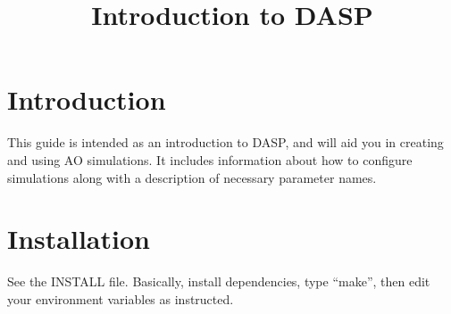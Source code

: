 \documentclass{article}
\begin{document}
%
\newcommand{\daspproject}{Durham AO Simulation Platform}
\newcommand{\dasptitle}{Introduction to DASP}
\newcommand{\daspdocno}{DASP-INT-UoD-001}
\newcommand{\daspdoctype}{Internal}
\newcommand{\daspissue}{0.1.1}
\newcommand{\daspreleasedate}{\today}
\newcommand{\daspauthorname}{Alastair Basden}
\newcommand{\daspauthortype}{AO sim team member}
\newcommand{\daspapprovername}{Alastair Basden}
\newcommand{\daspapprovertype}{AO sim team member}
\newcommand{\daspreleasername}{Alastair Basden}
\newcommand{\daspreleasertype}{AO sim team member}
\newcommand{\daspreviewername}{Alastair Basden}
\newcommand{\daspreviewertype}{AO sim team member}
\newcommand{\daspchangerecord}{
\begin{tabular}{|l|l|l|l|}
\hline
Issue number & Release date & section(s) affected & Description of
change/remarks\\ \hline
0.1.0 & 160209 & All & First draft \\ \hline
\end{tabular}
}
\newcommand{\daspnotificationlist}{
Alastair Basden\\
}
\newcommand{\daspabbreviations}{
\begin{tabular}{rl}
AO & Adaptive Optics\\
\end{tabular}
}
\newcommand{\daspapplicabledocs}{
\begin{tabular}{|l|l|l|}\hline
AD Number & Document title & Doc number/publication/location \\ \hline
\end{tabular}
}
\newcommand{\dasprefdocs}{
\begin{tabular}{|l|l|l|}\hline
RD number & Document title & Doc number/publication/location \\ \hline
\end{tabular}
}
\title{\dasptitle}





\section{Introduction}
This guide is intended as an introduction to DASP, and will aid you in
creating and using AO simulations.  It includes information about how
to configure simulations along with a description of necessary
parameter names.

\section{Installation}
See the INSTALL file.  Basically, install dependencies, type
``make'', then edit your environment variables as instructed.
\end{document}
